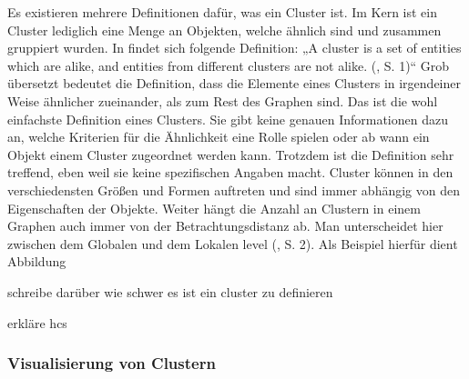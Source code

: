 Es existieren mehrere Definitionen dafür, was ein Cluster ist. Im Kern ist ein Cluster lediglich eine Menge an Objekten, welche ähnlich sind und zusammen gruppiert wurden. In  findet sich folgende Definition: „A cluster is a set of entities which are alike, and entities from different clusters are not alike. (\cite{clustering:AlgosForClust}, S. 1)“ Grob übersetzt bedeutet die Definition, dass die Elemente eines Clusters in irgendeiner Weise ähnlicher zueinander, als zum Rest des Graphen sind. Das ist die wohl einfachste Definition eines Clusters. Sie gibt keine genauen Informationen dazu an, welche Kriterien für die Ähnlichkeit eine Rolle spielen oder ab wann ein Objekt einem Cluster zugeordnet werden kann. Trotzdem ist die Definition sehr treffend, eben weil sie keine spezifischen Angaben macht. Cluster können in den verschiedensten Größen und Formen auftreten und sind immer abhängig von den Eigenschaften der Objekte. Weiter hängt die Anzahl an Clustern in einem Graphen auch immer von der Betrachtungsdistanz ab. Man unterscheidet hier zwischen dem Globalen und dem Lokalen level (\cite{clustering:AlgosForClust}, S. 2). Als Beispiel hierfür dient Abbildung 

schreibe darüber wie schwer es ist ein cluster zu definieren

erkläre hcs


\subsubsection{Visualisierung von Clustern}
